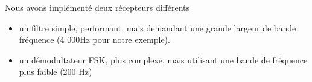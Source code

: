 Nous avons implémenté deux récepteurs différents
\begin{itemize}
   \item un filtre simple, performant, mais demandant une grande largeur de bande fréquence (4 000Hz pour notre exemple).
   \item un démodultateur FSK, plus complexe, mais utilisant une bande de fréquence plus faible (200 Hz)
\end{itemize}